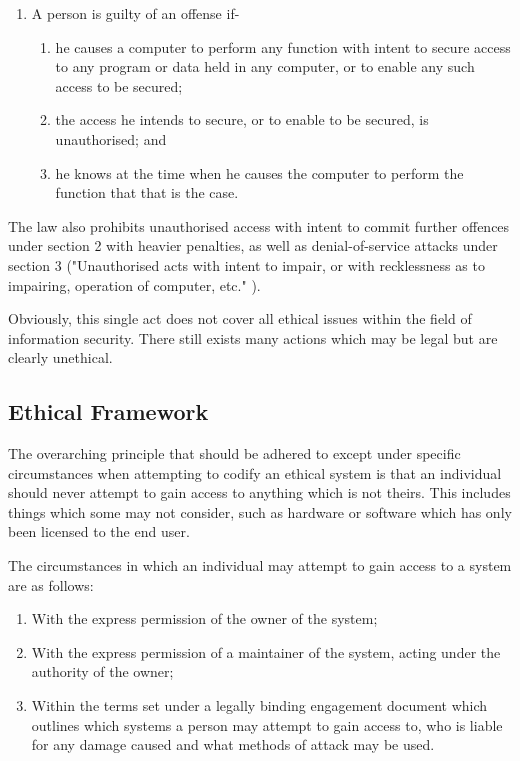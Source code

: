 \documentclass[12pt]{article}
\begin{document}
\begin{enumerate}
\item{A person is guilty of an offense if-}
\begin{enumerate}
\item{he causes a computer to perform any function with intent to secure access to any program or data held in any computer, or to enable any such access to be secured;}
\item{the access he intends to secure, or to enable to be secured, is unauthorised; and}
\item{he knows at the time when he causes the computer to perform the function that that is the case.}
\end{enumerate}
\end{enumerate}

The law also prohibits unauthorised access with intent to commit further offences under section 2 with heavier penalties, as well as denial-of-service attacks under section 3 ("Unauthorised acts with intent to impair, or with recklessness as to impairing, operation of computer, etc." \citep{computermisuseact}).

Obviously, this single act does not cover all ethical issues within the field of information security. There still exists many actions which may be legal but are clearly unethical.

\subsection{Ethical Framework}
The overarching principle that should be adhered to except under specific circumstances when attempting to codify an ethical system is that an individual should never attempt to gain access to anything which is not theirs. This includes things which some may not consider, such as hardware or software which has only been licensed to the end user.

The circumstances in which an individual may attempt to gain access to a system are as follows:

\begin{enumerate}
\item{With the express permission of the owner of the system;}
\item{With the express permission of a maintainer of the system, acting under the authority of the owner;}
\item{Within the terms set under a legally binding engagement document which outlines which systems a person may attempt to gain access to, who is liable for any damage caused and what methods of attack may be used.}
\end{enumerate}
\end{document}
